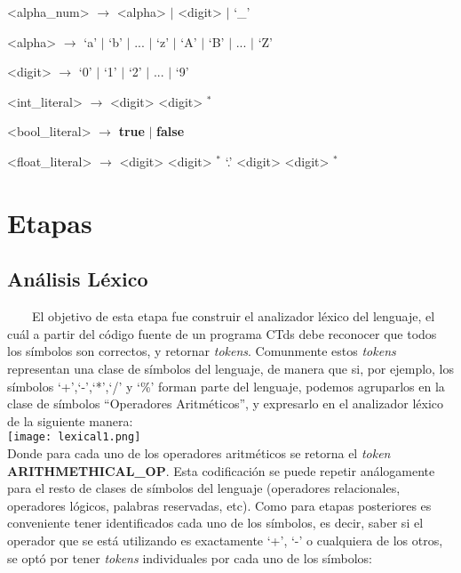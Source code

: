 \documentclass[11pt,a4paper]{article}
\begin{document}
\begin{grammar}
<alpha_num> $\rightarrow$ <alpha> $\mid$ <digit> $\mid$ `_'

<alpha> $\rightarrow$ `a' $\mid$ `b' $\mid$ ... $\mid$ `z' $\mid$ `A' $\mid$ `B' $\mid$ ... $\mid$ `Z'

<digit> $\rightarrow$ `0' $\mid$ `1' $\mid$ `2' $\mid$ ... $\mid$ `9'

<int_literal> $\rightarrow$ <digit> <digit> $^{*}$

<bool_literal> $\rightarrow$ \textbf{true} $\mid$ \textbf{false}

<float_literal> $\rightarrow$ <digit> <digit> $^{*}$ `.' <digit> <digit> $^{*}$

\end{grammar}

\section{Etapas}

\subsection{Análisis Léxico}

\ \ \ \ El objetivo de esta etapa fue construir el analizador léxico del lenguaje, el cuál a partir del código fuente de un programa CTds debe reconocer que todos los símbolos son correctos, y retornar \textit{tokens}. Comunmente estos \textit{tokens} representan una clase de símbolos del lenguaje, de manera que si, por ejemplo, los símbolos `+',`-',`*',`/' y `\%' forman parte del lenguaje, podemos agruparlos en la clase de símbolos ``Operadores Aritméticos'', y expresarlo en el analizador léxico de la siguiente manera:
\\

\texttt{[image: lexical1.png]} \\ 
 
Donde para cada uno de los operadores aritméticos se retorna el \textit{token} \textbf{ARITHMETHICAL_OP}. Esta codificación se puede repetir análogamente para el resto de clases de símbolos del lenguaje (operadores relacionales, operadores lógicos, palabras reservadas, etc). Como para etapas posteriores es conveniente tener identificados cada uno de los símbolos, es decir, saber si el operador que se está utilizando es exactamente `+', `-' o cualquiera de los otros, se optó por tener \textit{tokens} individuales por cada uno de los símbolos:
\\
\end{document}
